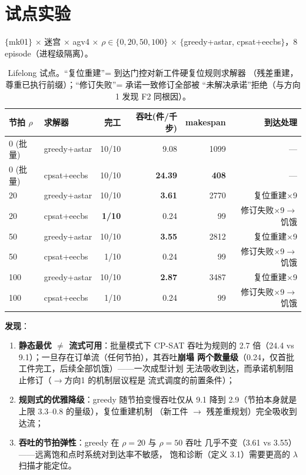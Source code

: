 \documentclass[UTF8,12pt,a4paper]{ctexart}
\begin{document}
\section{试点实验}\label{sec:pilot}

$\{$mk01$\}$ $\times$ 迷宫 $\times$ agv4 $\times$ $\rho\in\{0,20,50,100\}$
$\times$ $\{$greedy+astar, cpsat+eecbs$\}$，8 episode（进程级隔离）。

\begin{table}[h]
\centering
\begin{tabular}{llrrrr}
\toprule
节拍 $\rho$ & 求解器 & 完工 & 吞吐(件/千步) & makespan & 到达处理 \\
\midrule
0 (批量) & greedy+astar & 10/10 & 9.08 & 1099 & — \\
0 (批量) & cpsat+eecbs  & 10/10 & \textbf{24.39} & \textbf{408} & — \\
20 & greedy+astar & 10/10 & \textbf{3.61} & 2770 & 复位重建$\times$9 \\
20 & cpsat+eecbs  & \textbf{1/10} & 0.24 & 99 & 修订失败$\times$9$\to$饥饿 \\
50 & greedy+astar & 10/10 & \textbf{3.55} & 2812 & 复位重建$\times$9 \\
50 & cpsat+eecbs  & 1/10 & 0.24 & 99 & 修订失败$\times$9$\to$饥饿 \\
100 & greedy+astar & 10/10 & \textbf{2.87} & 3487 & 复位重建$\times$9 \\
100 & cpsat+eecbs  & 1/10 & 0.24 & 99 & 修订失败$\times$9$\to$饥饿 \\
\bottomrule
\end{tabular}
\caption{Lifelong 试点。``复位重建''= 到达门控对新工件硬复位规则求解器
（残差重建，尊重已执行前缀）；``修订失败''= 承诺一致修订全部被
``未解决承诺''拒绝（与方向1 发现 F2 同根因）。}
\label{tab:lifelong}
\end{table}

\textbf{发现}：
\begin{enumerate}
  \item \textbf{静态最优 $\neq$ 流式可用}：批量模式下 CP-SAT 吞吐为规则的
    2.7 倍（24.4 vs 9.1）；一旦存在订单流（任何节拍），其吞吐\textbf{崩塌
    两个数量级}（0.24，仅首批工件完工，后续全部饥饿）——一次成型计划
    无法吸收到达，而承诺机制阻止修订（$\to$方向1 的机制层议程是
    流式调度的前置条件）；
  \item \textbf{规则式的优雅降级}：greedy 随节拍变慢吞吐仅从 9.1 降到
    2.9（节拍本身就是上限 3.3--0.8 的量级），复位重建机制
    （新工件 $\to$ 残差重规划）完全吸收到达流；
  \item \textbf{吞吐的节拍弹性}：greedy 在 $\rho{=}20$ 与 $\rho{=}50$ 吞吐
    几乎不变（3.61 vs 3.55）——远离饱和点时系统对到达率不敏感，
    饱和诊断（定义 3.1）需要更高的 $\lambda$ 扫描才能定位。
\end{enumerate}
\end{document}
